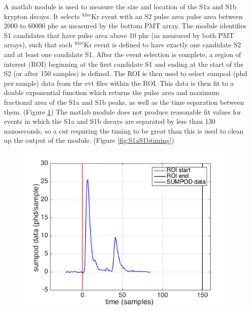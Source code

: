 \documentclass[a4paper,12pt]{article}
\begin{document}
{A matlab module is used to measure the size and location of the S1a and S1b krypton decays. It selects $^{83m}$Kr event with an S2 pulse area pulse area between 2000 to 60000 phe as measured by the bottom PMT array.  The module identifies S1 candidates that have pulse area above 10 phe (as measured by both PMT arrays), such that each $^{83m}$Kr event is defined to have exactly one candidate S2 and at least one candidate S1.  After the event selection is complete, a region of interest (ROI) beginning at the first candidate S1 and ending at the start of the S2 (or after 150 samples) is defined. The ROI is then used to select sumpod (phd per sample) data from the evt files within the ROI.  This data is then fit to a double exponential function which returns the pulse area and maximum fractional area of the S1a and S1b peaks, as well as the time separation between them. (Figure \ref{fig:Sumpod}) The matlab module does not produce reasonable fit values for events in which the S1a and S1b decays are separated by less than 130 nanoseconds, so a cut requiring the timing to be great than this is used to clean up the output of the module.  (Figure \ref{fig:S1aS1btiming})

\begin{figure}[!h]
\includegraphics[scale=0.6]{Run04Corrections/s1a_s1b_sumpod.png}
 \label{fig:Sumpod}
\end{figure}

}
\end{document}
